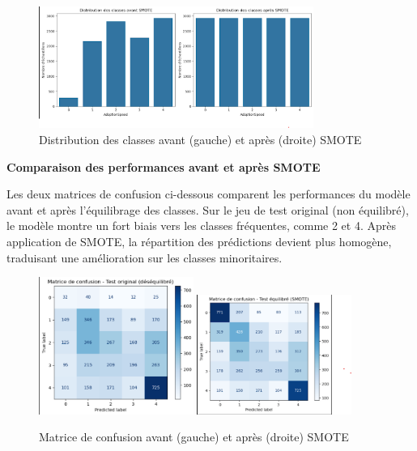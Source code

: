 \documentclass[a4paper,12pt]{article}
\begin{document}
\begin{figure}[H]
    \centering
    \includegraphics[width=0.8\textwidth]{distribution_smote.png}
    \caption{Distribution des classes avant (gauche) et après (droite) SMOTE}
    \label{fig:smote_distribution}
\end{figure}

\vspace{0.5em}
\noindent\textbf{Comparaison des performances avant et après SMOTE}

Les deux matrices de confusion ci-dessous comparent les performances du modèle avant et après l’équilibrage des classes. Sur le jeu de test original (non équilibré), le modèle montre un fort biais vers les classes fréquentes, comme 2 et 4. Après application de SMOTE, la répartition des prédictions devient plus homogène, traduisant une amélioration sur les classes minoritaires.

\begin{figure}[H]
    \centering
    \includegraphics[width=0.45\textwidth]{matrice_confusion_avant_smote.png}
    \hfill
    \includegraphics[width=0.45\textwidth]{matrice_confusion_apres_smote.png}
    \caption{Matrice de confusion avant (gauche) et après (droite) SMOTE}
    \label{fig:smote_matrices}
\end{figure}
\end{document}
